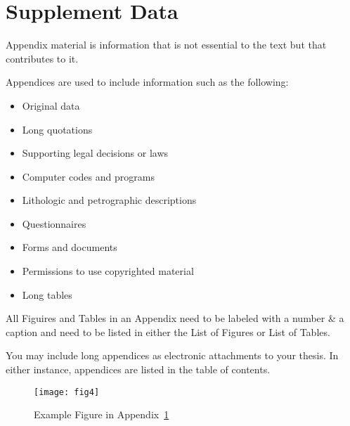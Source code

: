 \chapter{Supplement Data}\label{appendix:1}

Appendix material is information that is not
essential to the text but that contributes to it.

Appendices are used to include information such as the following:

\begin{itemize}
	\item Original data
	\item Long quotations 
	\item Supporting legal decisions or laws 
	\item Computer codes and programs 
	\item Lithologic and petrographic descriptions
	\item Questionnaires 	
	\item Forms and documents 
	\item Permissions to use copyrighted material
	\item Long tables
\end{itemize}


All Figuires and  Tables in an Appendix need to be labeled with a number \& a caption and need to be listed in either the List of Figures or List of Tables.

You may include long appendices as electronic attachments to your thesis. In either instance, appendices are listed in the table of contents.

\begin{figure}[h]
	\centering
	\texttt{[image: fig4]}
	\caption{Example Figure in Appendix~\ref{appendix:1}}
\end{figure}


\lipsum[5-9]
